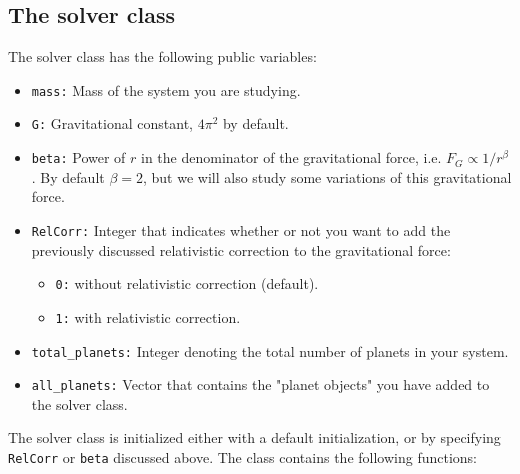 \documentclass[12pt, a4paper]{article}
\begin{document}
\subsection{The solver class}

The solver class has the following public variables: 
\begin{itemize}
\item \texttt{mass:} Mass of the system you are studying. 
\item \texttt{G:} Gravitational constant, $4\pi^2$ by default. 
\item \texttt{beta:} Power of $r$ in the denominator of the gravitational force, i.e. 
$F_G \propto 1/r^{\beta}$. By default $\beta = 2$, but we will also study some variations of this 
gravitational force. 
\item \texttt{RelCorr:} Integer that indicates whether or not you want to add the previously discussed 
relativistic correction to the gravitational force:
\begin{itemize}
\item \texttt{0:} without relativistic correction (default). 
\item \texttt{1:} with relativistic correction. 
\end{itemize}  
\item \texttt{total\_planets:} Integer denoting the total number of planets in your system. 
\item \texttt{all\_planets:} Vector that contains the "planet objects" you have added to the solver class. 
\end{itemize}
The solver class is initialized either with a default initialization, or by specifying \texttt{RelCorr} 
or \texttt{beta} discussed above. The class contains the following functions: 
\end{document}
